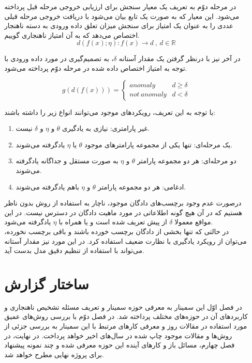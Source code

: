 \documentclass[12pt,a4paper]{report}
\begin{document}
در مرحله دوّم به تعریف یک معیار سنجش برای ارزیابی خروجی مرحله قبل پرداخته می‌شود. این معیار که به صورت یک تابع بیان می‌شود با دریافت خروجی مرحله قبلی عددی را به عنوان یک امتیاز برای سنجش میزان تعلق داده ورودی به دسته ناهنجار اختصاص می‌دهد که به آن امتیاز ناهنجاری گوییم.
\begin{equation}
d(f(x);\eta): f(x) \rightarrow d \  ,\  d \in \mathbb{R}
\end{equation}

در آخر نیز با درنظر گرفتن یک مقدار آستانه $\delta$، به تصمیم‌گیری در مورد داده ورودی با توجه به امتیاز اختصاص داده شده در مرحله دوّم پرداخته می‌شود.

\begin{equation}
g(d(f(x))) = 
\left\{
	\begin{array}{ll}
		anomaly  & d \geq \delta \\
		not\ anomaly & d < \delta
	\end{array}
\right.
\end{equation}

با توجه به این تعریف، رویکرد‌های موجود می‌توانند انواع زیر را داشته باشند:
\begin{enumerate}
	\item {غیر پارامتری: نیازی به یادگیری $\theta$ و $\eta$ و $\delta$ نیست.}
	\item{یک مرحله‌ای: تنها یکی از مجموعه پارامترهای موجود $\theta$ یا  $\eta$ یاد‌گرفته می‌شوند.}
	\item{دو مرحله‌ای:‌ هر دو مجموعه پارامتر $\theta$ و $\eta$ به صورت مستقل و جداگانه یاد‌گرفته می‌شوند.}
	\item{ادغامی: هر دو مجموعه پارامتر $\theta$ و $\eta$ باهم یادگرفته می‌شوند. }
\end{enumerate}

درصورت عدم وجود برچسب‌های دادگان موجود، ناچار به استفاده از روش بدون ناظر هستیم که در آن هیچ گونه اطلاعاتی در مورد ماهیت دادگان در دسترس نیست. در  این مواقع معمولا $\delta$ از پیش تعریف شده است و یا همراه با  $\eta$ یادگرفته می‌شود.\\
در حالتی که تنها بخشی از دادگان برچسب خورده باشند و باقی برچسب نخورده، می‌توان از رویکرد یادگیری با نظارت ضعیف استفاده کرد. در این مورد نیز مقدار آستانه می‌تواند با استفاده از تنظیم دقیق مدل بدست آید.
\section{ساختار گزارش}
در فصل اوّل این سمینار به معرفی حوزه سمینار و تعریف مسئله تشخیص ناهنجاری و کاربرد‌های آن در حوزه‌های مختلف پرداخته شد. در فصل دوّم  با بررسی روش‌های عمیق مورد استفاده در مقالات روز و معرفی کار‌های مرتبط با این سمینار به بررسی جزئی از روش‌ها و مقالات موجود چاپ شده در سال‌های اخیر خواهد پرداخت. در نهایت، در فصل چهارم، مسائل باز و کار‌های آینده این حوزه معرفی شده و چند نمونه پیشنهاد برای پروژه نهایی مطرح خواهد شد.
\end{document}
